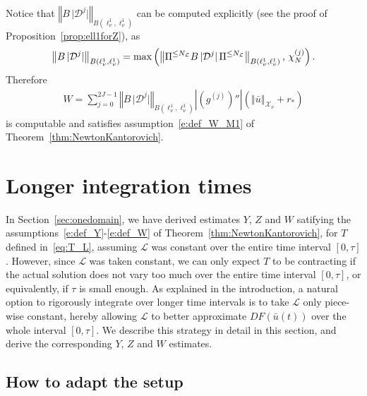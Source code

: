 \documentclass[10pt,a4paper]{article}
\theoremstyle{plain}
\renewcommand{\L}{\mathcal{L}}
\newcommand{\D}{\mathcal{D}}
\newcommand{\X}{\mathcal{X}}
\newcommand{\bu}{\bar{u}}
\newcommand{\1}{\mathbf{1}}
\newcommand{\rstar}{r_*}
\newcommand{\NL}{N_{\text{\tiny{$\L$}}}}
\begin{document}
Notice that $\left\Vert B \, \vert\D^j\vert\right\Vert_{B(\ell^1_\nu,\ell^1_\nu)}$ can be computed explicitly (see the proof of Proposition~\ref{prop:ell1forZ}), as 
\begin{align*}
\left\Vert B \, \vert\D^j\vert\right\Vert_{B(\ell^1_\nu,\ell^1_\nu)} = \max\left(\left\Vert \Pi^{\leq \NL} B\, \vert \D^j\vert\, \Pi^{\leq \NL}\right\Vert_{B(\ell^1_\nu,\ell^1_\nu)} ,\, \chi^{(j)}_N\right) .
\end{align*}
Therefore
\begin{align*}
W = \sum_{j=0}^{2J-1} \left\Vert B \, \vert\D^j\vert\right\Vert_{B(\ell^1_\nu,\ell^1_\nu)}   \left \vert \left( g^{(j)} \right)'' \right \vert \left( \left\Vert \bar u \right\Vert_{\X_\nu} + \rstar \right)
\end{align*}
is computable and satisfies assumption~\eqref{e:def_W_M1} of Theorem~\ref{thm:NewtonKantorovich}.








\section{Longer integration times}
\label{sec:domaindecomposition}

In Section~\ref{sec:onedomain}, we have derived estimates $Y$, $Z$ and $W$ satifying the assumptions~\eqref{e:def_Y}-\eqref{e:def_W} of Theorem~\ref{thm:NewtonKantorovich}, for $T$ defined in~\eqref{eq:T_L}, assuming $\L$ was constant over the entire time interval $[0,\tau]$. However, since $\L$ was taken constant, we can only expect $T$ to be contracting if the actual solution does not vary too much over the entire time interval $[0,\tau]$, or equivalently, if $\tau$ is small enough. As explained in the introduction, a natural option to rigorously integrate over longer time intervals is to take $\L$ only piece-wise constant, hereby allowing $\L$ to better approximate $DF(\bu(t))$ over the whole interval $[0,\tau]$. We describe this strategy in detail in this section, and derive the corresponding $Y$, $Z$ and $W$ estimates.



\subsection{How to adapt the setup}
\label{sec:setup_DD}
\end{document}
